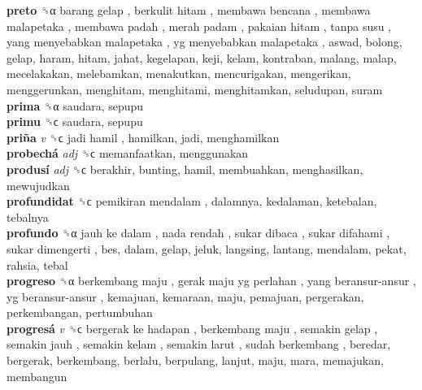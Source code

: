 \textbf{preto} ␝α   barang gelap ,  berkulit hitam ,  membawa bencana ,  membawa malapetaka ,  membawa padah ,  merah padam ,  pakaian hitam ,  tanpa susu ,  yang menyebabkan malapetaka ,  yg menyebabkan malapetaka , aswad, bolong, gelap, haram, hitam, jahat, kegelapan, keji, kelam, kontraban, malang, malap, mecelakakan, melebamkan, menakutkan, mencurigakan, mengerikan, menggerunkan, menghitam, menghitami, menghitamkan, seludupan, suram  \\
\textbf{prima} ␝α  saudara, sepupu  \\
\textbf{primu} ␝ϲ  saudara, sepupu  \\
\textbf{priña} \emph{v}  ␝ϲ   jadi hamil , hamilkan, jadi, menghamilkan  \\
\textbf{probechá} \emph{adj}  ␝ϲ  memanfaatkan, menggunakan  \\
\textbf{produsí} \emph{adj}  ␝ϲ  berakhir, bunting, hamil, membuahkan, menghasilkan, mewujudkan  \\
\textbf{profundidat} ␝ϲ   pemikiran mendalam , dalamnya, kedalaman, ketebalan, tebalnya  \\
\textbf{profundo} ␝α   jauh ke dalam ,  nada rendah ,  sukar dibaca ,  sukar difahami ,  sukar dimengerti , bes, dalam, gelap, jeluk, langsing, lantang, mendalam, pekat, rahsia, tebal  \\
\textbf{progreso} ␝α   berkembang maju ,  gerak maju yg perlahan ,  yang beransur-ansur ,  yg beransur-ansur , kemajuan, kemaraan, maju, pemajuan, pergerakan, perkembangan, pertumbuhan  \\
\textbf{progresá} \emph{v}  ␝ϲ   bergerak ke hadapan ,  berkembang maju ,  semakin gelap ,  semakin jauh ,  semakin kelam ,  semakin larut ,  sudah berkembang , beredar, bergerak, berkembang, berlalu, berpulang, lanjut, maju, mara, memajukan, membangun  \\
